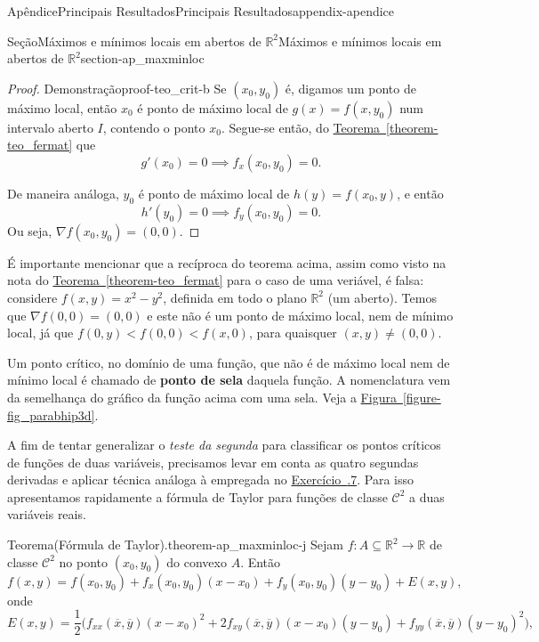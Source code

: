 \documentclass[oneside,10pt,]{book}
\newcommand{\xreffont}{\relax}
\newcommand{\terminology}[1]{\textbf{#1}}
\numberwithin{equation}{section}
\newcommand{\R}{\mathbb R}
\begin{document}
\begin{appendixptx}{Apêndice}{Principais Resultados}{}{Principais Resultados}{}{}{appendix-apendice}
\begin{sectionptx}{Seção}{Máximos e mínimos locais em abertos de \(\R^2\)}{}{Máximos e mínimos locais em abertos de \(\R^2\)}{}{}{section-ap_maxminloc}
\begin{proof}{Demonstração}{}{proof-teo_crit-b}
Se \((x_0,y_0)\) é, digamos um ponto de máximo local, então \(x_0\) é ponto de máximo local de \(g(x)=f(x,y_0)\) num intervalo aberto \(I\), contendo o ponto \(x_0\). Segue-se então, do \hyperref[theorem-teo_fermat]{Teorema~{\xreffont\ref{theorem-teo_fermat}}} que%
\begin{equation*}
g'(x_0)=0\implies
f_x(x_0,y_0)=0.
\end{equation*}
%
\par
De maneira análoga, \(y_0\) é ponto de máximo local de \(h(y)=f(x_0,y)\), e então%
\begin{equation*}
h'(y_0)=0\implies f_y(x_0,y_0)=0.
\end{equation*}
%
 Ou seja, \(\nabla
f(x_0,y_0)=(0,0)\).\end{proof}
É importante mencionar que a recíproca do teorema acima, assim como visto na nota do \hyperref[theorem-teo_fermat]{Teorema~{\xreffont\ref{theorem-teo_fermat}}} para o caso de uma veriável, é falsa: considere \(f(x,y)=x^2-y^2\), definida em todo o plano \(\R^2\) (um aberto). Temos que \(\nabla f(0,0)=(0,0)\) e este não é um ponto de máximo local, nem de mínimo local, já que \(f(0,y)< f(0,0) < f(x,0)\), para quaisquer \((x,y)\neq
(0,0)\).%
\par
Um ponto crítico, no domínio de uma função, que não é de máximo local nem de mínimo local é chamado de \terminology{ponto de sela} daquela função. A nomenclatura vem da semelhança do gráfico da função acima com uma sela. Veja a \hyperref[figure-fig_parabhip3d]{Figura~{\xreffont\ref{figure-fig_parabhip3d}}}.%
\par
A fim de tentar generalizar o \emph{teste da segunda} para classificar os pontos críticos de funções de duas variáveis, precisamos levar em conta as quatro segundas derivadas e aplicar técnica análoga à empregada no \hyperlink{exercise-teste_segder}{Exercício~{\xreffont 1.1.7}}. Para isso apresentamos rapidamente a fórmula de Taylor para funções de classe \(\mathscr{C}^2\) a duas variáveis reais.%
\begin{theorem}{Teorema}{(Fórmula de Taylor).}{}{theorem-ap_maxminloc-j}%
Sejam \(f\colon A\subseteq\R^2\to\R\) de classe \(\mathscr{C}^2\) no ponto \((x_0,y_0)\) do convexo \(A\). Então%
\begin{equation*}
f(x,y)=f(x_0,y_0)+f_x(x_0,y_0)(x-x_0)+f_y(x_0,y_0)(y-y_0)+E(x,y),
\end{equation*}
onde%
\begin{equation*}
E(x,y)=\dfrac{1}{2}\Big(f_{xx}(\overline{x},\overline{y})(x-x_0)^2+2f_{xy}(\overline{x},\overline{y})(x-x_0)(y-y_0)+f_{yy}(\overline{x},\overline{y})(y-y_0)^2\Big),

\end{equation*}
\end{theorem}
\end{sectionptx}
\end{appendixptx}
\end{document}
